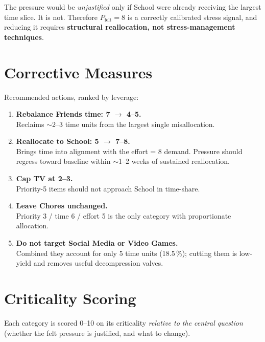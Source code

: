 \documentclass[11pt,a4paper]{article}
\begin{document}
\begin{keybox}
The pressure would be \emph{unjustified} only if School were already receiving the largest time slice. It is not. Therefore $P_\text{felt} = 8$ is a correctly calibrated stress signal, and reducing it requires \textbf{structural reallocation, not stress-management techniques}.
\end{keybox}

\section{Corrective Measures}
\label{sec:fixes}

Recommended actions, ranked by leverage:

\begin{enumerate}[leftmargin=1.6em, itemsep=4pt]
  \item \textbf{Rebalance Friends time: 7 $\rightarrow$ 4--5.}\\
        Reclaims $\sim$2--3 time units from the largest single misallocation.
  \item \textbf{Reallocate to School: 5 $\rightarrow$ 7--8.}\\
        Brings time into alignment with the effort = 8 demand. Pressure should regress toward baseline within $\sim$1--2 weeks of sustained reallocation.
  \item \textbf{Cap TV at 2--3.}\\
        Priority-5 items should not approach School in time-share.
  \item \textbf{Leave Chores unchanged.}\\
        Priority 3 / time 6 / effort 5 is the only category with proportionate allocation.
  \item \textbf{Do not target Social Media or Video Games.}\\
        Combined they account for only 5 time units (18.5\,\%); cutting them is low-yield and removes useful decompression valves.
\end{enumerate}

\section{Criticality Scoring}
\label{sec:criticality}

Each category is scored 0--10 on its criticality \emph{relative to the central question} (whether the felt pressure is justified, and what to change).
\end{document}
